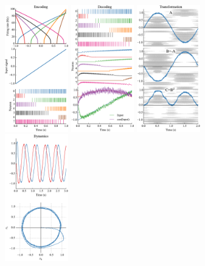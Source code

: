 \documentclass{frontiersSCNS}
\begin{document}
\begin{figure}
\begin{center}
  \includegraphics[width=0.245\textwidth]{nef_summary_enc}
  \includegraphics[width=0.245\textwidth]{nef_summary_dec}
  \includegraphics[width=0.245\textwidth]{nef_summary_trans}
  \includegraphics[width=0.245\textwidth]{nef_summary_dyn}

\end{center}
\end{figure}
\end{document}
